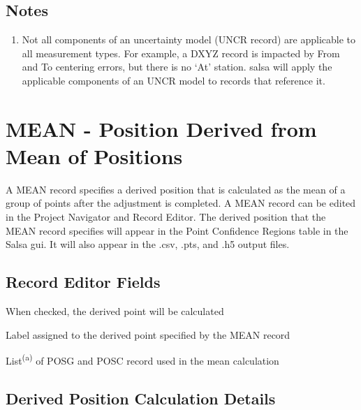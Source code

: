 \subsection*{Notes}
\begin{enumerate}
\item Not all components of an uncertainty model (UNCR record) are applicable to all measurement types.  For example, a DXYZ record is impacted by From and To centering errors, but there is no `At' station.  \textsf{salsa} will apply the applicable components of an UNCR model to records that reference it.
\end{enumerate}


\newpage
\section{MEAN - Position Derived from Mean of Positions} \label{sect:MEAN}

A MEAN record specifies a derived position that is calculated as the mean of a group of points after the adjustment is completed.  A MEAN record can be edited in the Project Navigator and Record Editor.  The derived position that the MEAN record specifies will appear in the Point Confidence Regions table in the Salsa gui.  It will also appear in the .csv, .pts, and .h5 output files.

\subsection*{Record Editor Fields}

\begin{description}[leftmargin=!,labelwidth=\widthof{\bfseries Positions:}]
\item[Enabled:] When checked, the derived point will be calculated
\item[Label:] Label assigned to the derived point specified by the MEAN record
\item[Positions:] List\textsuperscript{(a)} of POSG and POSC record used in the mean calculation
\end{description}

\subsection*{Derived Position Calculation Details}

